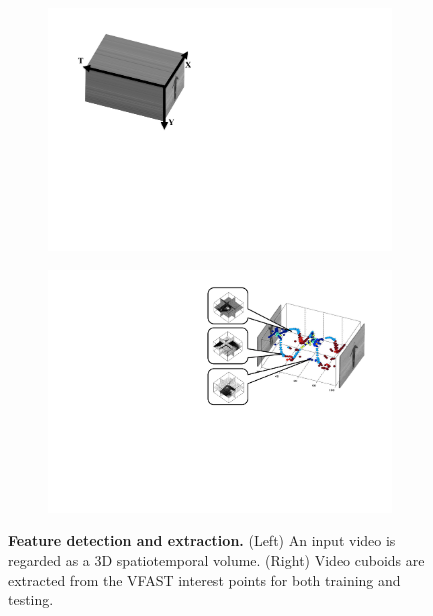 \begin{figure}[ht]
	\centering
	\begin{subfigure}[t]{0.48\linewidth} \centering 
		\includegraphics[height=0.66\linewidth]{./fig/act/act_fast_2.pdf} 
	\end{subfigure}
	\begin{subfigure}[t]{0.48\linewidth} \centering 
		\includegraphics[height=0.66\linewidth]{./fig/act/act_fast_1.pdf}
	\end{subfigure}
	\caption{\textbf{Feature detection and extraction. } (Left) An input video is regarded as a 3D spatiotemporal volume. (Right) Video cuboids are extracted from the VFAST interest points for both training and testing.}
	\label{fig/act/fastest}
\end{figure}

